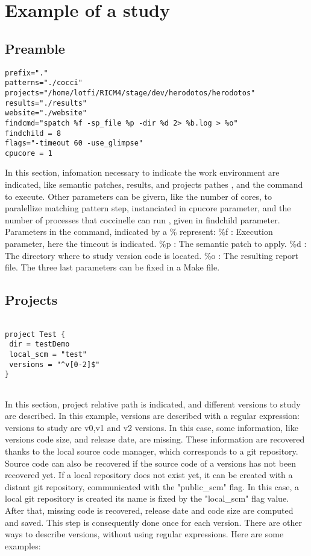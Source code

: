 \chapter{Example of a study}
\label{sec:study}

\section{Preamble}
\label{sec:ex-preamble}

\begin{lstlisting}
prefix="."
patterns="./cocci"
projects="/home/lotfi/RICM4/stage/dev/herodotos/herodotos"
results="./results"
website="./website"
findcmd="spatch %f -sp_file %p -dir %d 2> %b.log > %o"
findchild = 8
flags="-timeout 60 -use_glimpse"
cpucore = 1
\end{lstlisting}
In this section, infomation necessary to indicate the work environment are indicated, like semantic patches,
results, and projects pathes , and the command to execute.
Other parameters can be givern, like the number of cores, to paralellize matching pattern step, instanciated in 
cpucore parameter, and the number of processes that coccinelle can run , given in findchild parameter.
Parameters in the command, indicated by a \% represent:
  \%f : Execution parameter, here the timeout is indicated.
  \%p : The semantic patch to apply.
  \%d : The directory where to study version code is located.
  \%o : The resulting report file.
  The three last parameters can be fixed in a Make file.

\section{Projects}
\label{sec:ex-projects}


\begin{lstlisting}
 
project Test {
 dir = testDemo	
 local_scm = "test"
 versions = "^v[0-2]$"       
}
 
\end{lstlisting}
In this section, project relative path is indicated, and different versions to study are described.
In this example, versions are described with a regular expression: versions to study are v0,v1 and v2 versions.
In this case, some information, like versions code size, and release date, are missing. These information are recovered
thanks to the local source code manager, which corresponds to a git repository. Source code can also be recovered if
the source code of a versions has not been recovered yet. If a local repository does not exist yet, it can be created
with a distant git repository, communicated with the "public\_scm" flag. In this case, a local git repository is 
created its name is fixed by the "local\_scm" flag value. After that, missing code is recovered, release date and code 
size are computed and saved. This step is consequently done once for each version.
There are other ways to describe versions, without using  regular expressions. Here are some examples:

